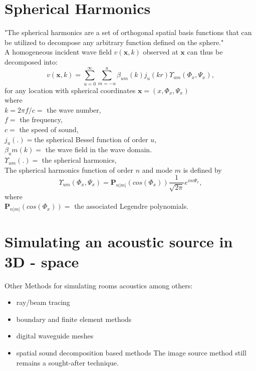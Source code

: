 \section{Spherical Harmonics}
"The spherical harmonics are a set of orthogonal spatial basis functions that can be utilized
to decompose any arbitrary function defined on the sphere."\cite{Samarasinghe2018}\\
A homogeneous incident wave field $v(\mathbf{x},k)$ observed at $\mathbf{x}$ can thus be decomposed into\cite{Zhang2019}:
\begin{equation}
    v(\mathbf{x},k)=\sum_{u=0}^\infty \sum_{m=-u}^u\beta_{um}(k)j_u(kr)\Upsilon_{um}(\Phi_x,\Psi_x),
\end{equation}
for any location with spherical coordinates $\mathbf{x}=(x,\Phi_x,\Psi_x)$\\
where\\
$k=2\pi f/c=$ the wave number,\\
$f=$ the frequency,\\
$c=$ the speed of sound,\\
$j_u(.)=$the spherical Bessel function of order $u$,\\
$\beta_um(k)=$ the wave field in the wave domain.\\ 
$\Upsilon_{um}(.)=$ the spherical harmonics,\\
The spherical harmonics function of order $n$ and mode $m$ is defined by\cite{Samarasinghe2018}
\begin{equation}
    \Upsilon_{um}(\Phi_x,\Psi_x) = \mathbf{P}_{n|m|}(cos(\Phi_x))\frac{1}{\sqrt{2\pi}}e^{im\Psi_x},
\end{equation}
where\\
$\mathbf{P}_{n|m|}(cos(\Phi_x))=$ the associated Legendre polynomials.
\section{Simulating an acoustic source in 3D - space}
Other Methods for simulating rooms acoustics among others:
\begin{itemize}
    \item ray/beam tracing
    \item boundary and finite element methods
    \item digital waveguide meshes
    \item spatial sound decomposition based methods
The image source method still remains a sought-after technique.\cite{Samarasinghe2018}
\end{itemize}

